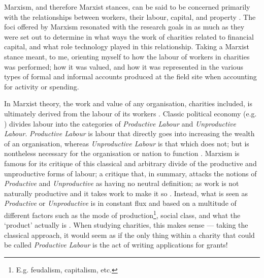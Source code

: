 Marxism, and therefore Marxist stances, can be said to be concerned primarily with the relationships between workers, their labour, capital, and property \cite{singer_marx:_2001, johnson_blackwell_2012}. The foci offered by Marxism resonated with the research goals in as much as they were set out to determine in what ways the work of charities related to financial capital, and what role technology played in this relationship. Taking a Marxist stance meant, to me, orienting myself to how the labour of workers in charities was performed; how it was valued, and how it was represented in the various types of formal and informal accounts produced at the field site when accounting for activity or spending.

In Marxist theory, the work and value of any organisation, charities included, is ultimately derived from the labour of its workers \cite{marx_contribution_1970}. Classic political economy (e.g. \cite{smith_inquiry_1785}) divides labour into the categories of \textit{Productive Labour} and \textit{Unproductive Labour}. \textit{Productive Labour} is labour that directly goes into increasing the wealth of an organisation, whereas \textit{Unproductive Labour} is that which does not; but is nontheless necessary for the organisation or nation to function \cite{smith_inquiry_1785}. Marxism is famous for its critique of this classical and arbitrary divide of the productive and unproductive forms of labour; a critique that, in summary, attacks the notions of \textit{Productive} and \textit{Unproductive} as having no neutral definition; as work is not naturally productive and it takes work to make it so \cite{marx_capital_1974, marx_theories_1964}. Instead, what is seen as \textit{Productive} or \textit{Unproductive} is in constant flux and based on a multitude of different factors such as the mode of production\footnote{E.g. feudalism, capitalism, etc.}, social class, and what the `product' actually is \cite{marx_capital_1974}. When studying charities, this makes sense --- taking the classical approach, it would seem as if the only thing within a charity that could be called \textit{Productive Labour} is the act of writing applications for grants!

